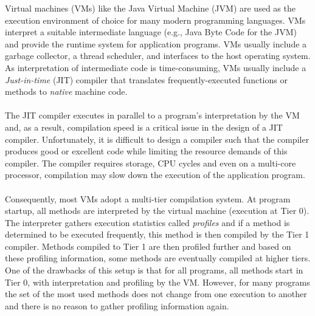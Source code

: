 Virtual machines (VMs) like the Java Virtual Machine (JVM) are used as the execution environment of choice for many modern programming languages. 
VMs interpret a suitable intermediate language (e.g., Java Byte Code for the JVM) and provide the runtime system for application programs. VMs usually include a garbage collector, a thread scheduler, and interfaces to the host operating system. 
As interpretation of intermediate code is time-consuming, VMs usually include a \textit{Just-in-time} (JIT) compiler that translates frequently-executed functions or methods to \textit{native} machine code.
\\\\
The JIT compiler executes in parallel to a program's interpretation by the VM and, as a result, compilation speed is a critical issue in the design of a JIT compiler.
Unfortunately, it is difficult to design a compiler such that the compiler produces good or excellent code while limiting the resource demands of this compiler. The compiler requires storage, CPU cycles and even on a multi-core processor, compilation may slow down the execution of the application program.
\\\\
Consequently, most VMs adopt a multi-tier compilation system.
At program startup, all methods are interpreted by the virtual machine (execution at Tier 0). The interpreter gathers execution statistics called \textit{profiles} and if a method is determined to be executed frequently, this method is then compiled by the Tier 1 compiler. Methods compiled to Tier 1 are then profiled further and based on these profiling information, some methods are eventually compiled at higher tiers.
One of the drawbacks of this setup is that for all programs, all methods start in Tier 0, with interpretation and profiling by the VM. However, for many programs the set of the most used methods does not change from one execution to another and there is no reason to gather profiling information again. 
